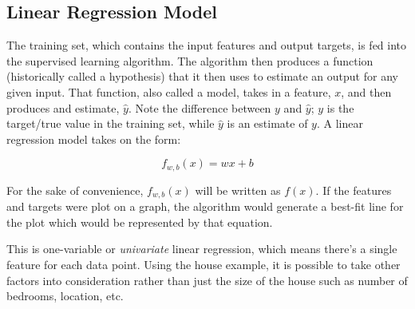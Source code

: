 \documentclass{article}
\begin{document}
\subsection{Linear Regression Model}
The training set, which contains the input features and output targets, is fed into the supervised learning algorithm. The algorithm then produces a function (historically called a hypothesis) that it then uses to estimate an output for any given input. That function, also called a model, takes  in a feature, $x$, and then produces and estimate, $\hat{y}$. Note the difference between $y$ and $\hat{y}$; $y$ is the target/true value in the training set, while $\hat{y}$ is an estimate of $y$. A linear regression model takes on the form:

\[ f_{w,b}(x) = wx + b\]

\noindent For the sake of convenience, $f_{w,b}(x)$ will be written as $f(x)$. If the features and targets were plot on a graph, the algorithm would generate a best-fit line for the plot which would be represented by that equation.
\vspace{5mm}


\noindent This is one-variable or \textit{univariate} linear regression, which means there's a single feature for each data point. Using the house example, it is possible to take other factors into consideration rather than just the size of the house such as number of bedrooms, location, etc.
\end{document}
